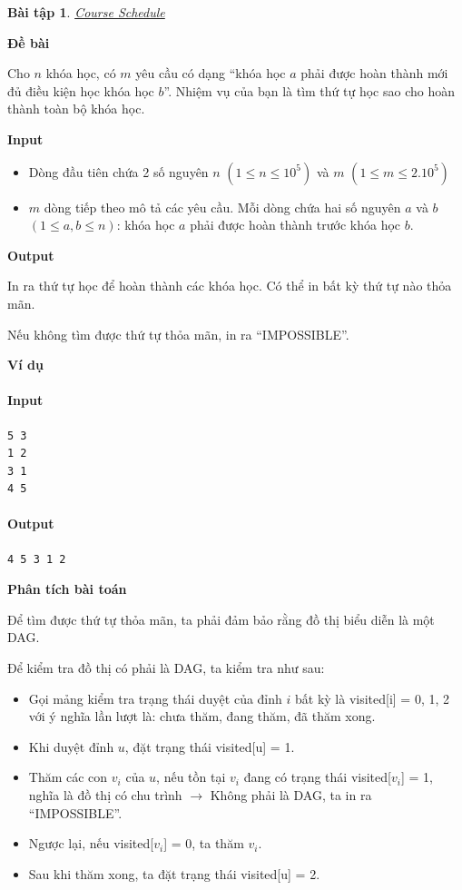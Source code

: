 \documentclass{article}
\newtheorem{baitap}{Bài tập}
\begin{document}
\begin{baitap}
    \href{https://cses.fi/problemset/task/1679}{Course Schedule}
\end{baitap}

\textbf{Đề bài}

Cho $n$ khóa học, có $m$ yêu cầu có dạng ``khóa học $a$ phải được hoàn thành mới đủ điều kiện học khóa học $b$''. Nhiệm vụ của bạn là tìm thứ tự học sao cho hoàn thành toàn bộ khóa học.

\textbf{Input}

\begin{itemize}
    \item Dòng đầu tiên chứa 2 số nguyên $n$ $(1 \leq n \leq 10^5)$ và $m$ $(1 \leq m \leq 2.10^5)$
    \item $m$ dòng tiếp theo mô tả các yêu cầu. Mỗi dòng chứa hai số nguyên $a$ và $b$ $(1 \leq a, b \leq n)$: khóa học $a$ phải được hoàn thành trước khóa học $b$.
\end{itemize}

\textbf{Output}

In ra thứ tự học để hoàn thành các khóa học. Có thể in bất kỳ thứ tự nào thỏa mãn. 

Nếu không tìm được thứ tự thỏa mãn, in ra ``IMPOSSIBLE''.

\textbf{Ví dụ}

\paragraph{Input}
\begin{lstlisting}
5 3
1 2
3 1
4 5
\end{lstlisting}

\paragraph{Output}
\begin{lstlisting}
4 5 3 1 2
\end{lstlisting}

\textbf{Phân tích bài toán}

Để tìm được thứ tự thỏa mãn, ta phải đảm bảo rằng đồ thị biểu diễn là một DAG. 

Để kiểm tra đồ thị có phải là DAG, ta kiểm tra như sau:
\begin{itemize}
    \item Gọi mảng kiểm tra trạng thái duyệt của đỉnh $i$ bất kỳ là visited[i] = {0, 1, 2} với ý nghĩa lần lượt là: chưa thăm, đang thăm, đã thăm xong.
    \item Khi duyệt đỉnh $u$, đặt trạng thái visited[u] = 1.
    \item Thăm các con $v_i$ của $u$, nếu tồn tại $v_i$ đang có trạng thái visited[$v_i$] = 1, nghĩa là đồ thị có chu trình $\rightarrow$ Không phải là DAG, ta in ra ``IMPOSSIBLE''.
    \item Ngược lại, nếu visited[$v_i$] = 0, ta thăm $v_i$.
    \item Sau khi thăm xong, ta đặt trạng thái visited[u] = 2. 
\end{itemize}
\end{document}
